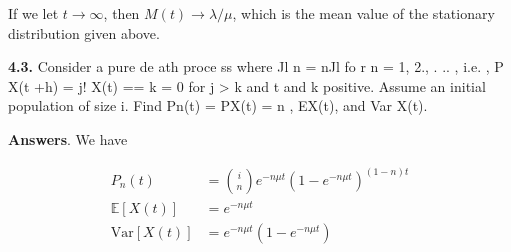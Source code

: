 \documentclass[12pt]{article}
\theoremstyle{nonumberbreak}
\begin{document}
If we let $t \to \infty$, then $M(t) \to \lambda/\mu$, which is the mean value of the stationary distribution given above. 



\textbf{4.3.} Consider a pure de ath proce ss where Jl n = nJl fo r n = 1, 2., . .. , i.e. , P {X(t +h) = j! X(t) == k} = 0 for j > k and t and k positive. Assume an initial population of
size i. Find Pn(t) = P{X(t) = n} , EX(t), and Var X(t).

\textbf{Answers}. We have


$$
\begin{aligned}
P_n(t) &= \binom{i}{n} e^{-n\mu t} (1 - e^{-n\mu t})^{(1-n)t} \\[8pt]
\mathbb{E} \left[ X(t) \right] &= e^{-n\mu t} \\[8pt]
\mathrm{Var} \left[ X(t) \right] &= e^{-n\mu t} (1 - e^{-n\mu t}) \\[8pt]
\end{aligned}
$$
\end{document}
